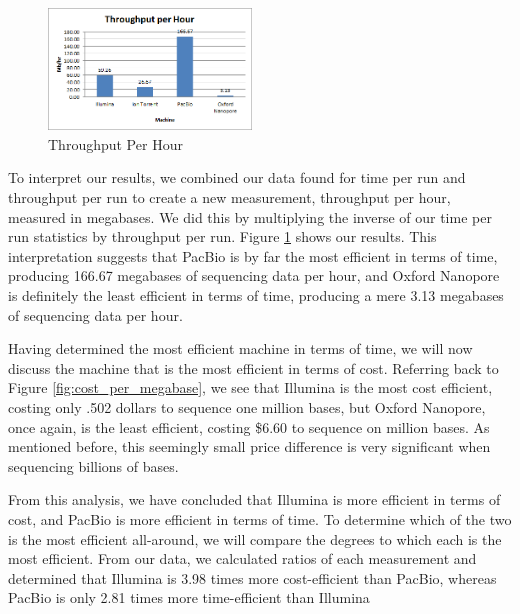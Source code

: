 \documentclass[12pt,letterpaper]{report}
\begin{document}
\begin{figure}
\vspace{-20pt}
  \begin{center}
    \includegraphics[width=0.48\textwidth]{throughput_per_hour.png}
  \end{center}
  \vspace{-20pt}
  \caption{Throughput Per Hour}
  \vspace{-10pt}
  \label{fig:throughput_per_hour}
\end{figure}

To interpret our results, we combined our data found for time per run and throughput per run to create a new measurement, throughput per hour, measured in megabases. We did this by multiplying the inverse of our time per run statistics by throughput per run. Figure \ref{fig:throughput_per_hour} shows our results. This interpretation suggests that PacBio is by far the most efficient in terms of time, producing 166.67 megabases of sequencing data per hour, and Oxford Nanopore is definitely the least efficient in terms of time, producing a mere 3.13 megabases of sequencing data per hour. 

Having determined the most efficient machine in terms of time, we will now discuss the machine that is the most efficient in terms of cost. Referring back to Figure \ref{fig:cost_per_megabase}, we see that Illumina is the most cost efficient, costing only .502 dollars to sequence one million bases, but Oxford Nanopore, once again, is the least efficient, costing \$6.60 to sequence on million bases. As mentioned before, this seemingly small price difference is very significant when sequencing billions of bases.

From this analysis, we have concluded that Illumina is more efficient in terms of cost, and PacBio is more efficient in terms of time. To determine which of the two is the most efficient all-around, we will compare the degrees to which each is the most efficient. From our data, we calculated ratios of each measurement and determined that Illumina is 3.98 times more cost-efficient than PacBio, whereas PacBio is only 2.81 times more time-efficient than Illumina
\end{document}
